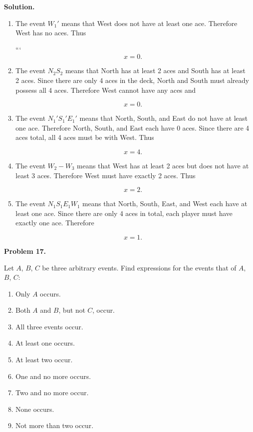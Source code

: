 \documentclass[12pt]{article}
\begin{document}
\textbf{Solution.}
\begin{enumerate}
\item[(a)] The event $W_1'$ means that West does not have at least one ace. Therefore West has no aces. Thus

```
\[
x=0.
\]

\item[(b)] The event $N_2S_2$ means that North has at least 2 aces and South has at least 2 aces. Since there are only 4 aces in the deck, North and South must already possess all 4 aces. Therefore West cannot have any aces and

\[
x=0.
\]

\item[(c)] The event $N_1'S_1'E_1'$ means that North, South, and East do not have at least one ace. Therefore North, South, and East each have 0 aces. Since there are 4 aces total, all 4 aces must be with West. Thus

\[
x=4.
\]

\item[(d)] The event $W_2-W_3$ means that West has at least 2 aces but does not have at least 3 aces. Therefore West must have exactly 2 aces. Thus

\[
x=2.
\]

\item[(e)] The event $N_1S_1E_1W_1$ means that North, South, East, and West each have at least one ace. Since there are only 4 aces in total, each player must have exactly one ace. Therefore

\[
x=1.
\]

\end{enumerate}

\textbf{Problem 17.}

Let $A$, $B$, $C$ be three arbitrary events. Find expressions for the events
that of $A$, $B$, $C$:

\begin{enumerate}
    \item[(a)] Only $A$ occurs.
    \item[(b)] Both $A$ and $B$, but not $C$, occur.
    \item[(c)] All three events occur.
    \item[(d)] At least one occurs.
    \item[(e)] At least two occur.
    \item[(f)] One and no more occurs.
    \item[(g)] Two and no more occur.
    \item[(h)] None occurs.
    \item[(i)] Not more than two occur.
\end{enumerate}
\end{document}

